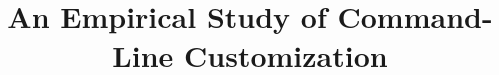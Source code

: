 \documentclass[10pt,conference]{IEEEtran}
\begin{document}
\title{An Empirical Study of Command-Line Customization\vspace{-1.5cm}}

%

\maketitle

\begin{abstract}
	
\end{abstract}



















\end{document}
